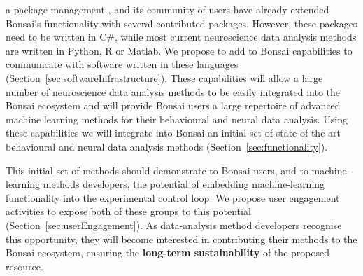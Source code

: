 a package management , and its community of users have
already extended Bonsai's functionality with several contributed packages.
%
However, these packages need to
be written in C\#, while most current neuroscience data analysis methods are
written in Python, R or Matlab. We propose to add to Bonsai capabilities to
communicate with software written in these languages
(Section~\ref{sec:softwareInfrastructure}).  These capabilities will allow a
large number of neuroscience data analysis methods to be easily integrated into
the Bonsai ecosystem and will provide Bonsai users a large repertoire of
advanced machine learning methods for their behavioural and neural data
analysis.
%
Using these capabilities we will integrate into Bonsai an initial set of
state-of-the art behavioural and neural data analysis methods
(Section~\ref{sec:functionality}).








This initial set of methods should demonstrate to Bonsai users, and to
machine-learning methods developers, the potential of embedding
machine-learning functionality into the experimental control loop. We propose
user engagement activities to expose both of these groups to this
potential (Section~\ref{sec:userEngagement}).  As data-analysis method
developers recognise this opportunity, they will become interested in
contributing their methods to the Bonsai ecosystem, ensuring the
\textbf{long-term sustainability} of the proposed resource.

